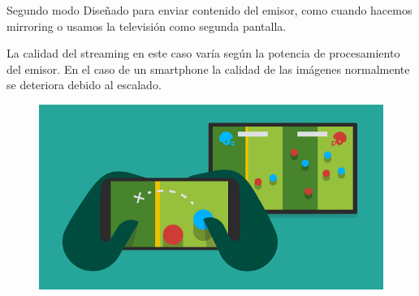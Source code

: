 	
\begin{frame}
	\begin{block}{Segundo modo}
		Diseñado para enviar contenido del emisor, como cuando hacemos mirroring o usamos la televisión como segunda pantalla.
		
		La calidad del streaming en este caso varía según la potencia de procesamiento del emisor. En el caso de un smartphone la calidad
		de las imágenes normalmente se deteriora debido al escalado.
	\end{block}
	
	\begin{figure}[h]
		\includegraphics[scale=0.3]{./Imagenes/seconddisplay.png}
	\end{figure}		
\end{frame}


